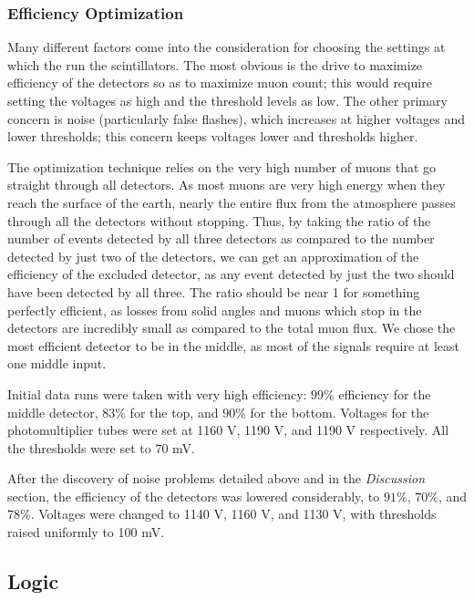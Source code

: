 \subsubsection{Efficiency Optimization}
\label{Efficiency Optimization}

Many different factors come into the consideration for choosing the settings at which the run the scintillators. The most obvious is the drive to maximize efficiency of the detectors so as to maximize muon count; this would require setting the voltages as high and the threshold levels as low. The other primary concern is noise (particularly false flashes), which increases at higher voltages and lower thresholds; this concern keeps voltages lower and thresholds higher.

The optimization technique relies on the very high number of muons that go straight through all detectors. As most muons are very high energy when they reach the surface of the earth, nearly the entire flux from the atmosphere passes through all the detectors without stopping. Thus, by taking the ratio of the number of events detected by all three detectors as compared to the number detected by just two of the detectors, we can get an approximation of the efficiency of the excluded detector, as any event detected by just the two should have been detected by all three. The ratio should be near 1 for something perfectly efficient, as losses from solid angles and muons which stop in the detectors are incredibly small as compared to the total muon flux. We chose the most efficient detector to be in the middle, as most of the signals require at least one middle input.

Initial data runs were taken with very high efficiency: $99\%$ efficiency for the middle detector, $83\%$ for the top, and $90\%$ for the bottom. Voltages for the photomultiplier tubes were set at 1160 V, 1190 V, and 1190 V respectively. All the thresholds were set to 70 mV. 

After the discovery of noise problems detailed above and in the \emph{Discussion} section, the efficiency of the detectors was lowered considerably, to $91\%$, $70\%$, and $78\%$. Voltages were changed to 1140 V, 1160 V, and 1130 V, with thresholds raised uniformly to 100 mV.

\subsection{Logic}
\label{Logic}

